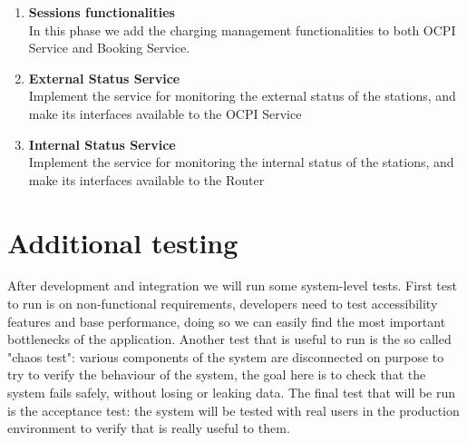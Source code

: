 \begin{enumerate}
	\item \textbf{Sessions functionalities}\\ In this phase we add the charging management functionalities to both OCPI Service and Booking Service.
	\item \textbf{External Status Service}\\ Implement the service for monitoring the external status of the stations, and make its interfaces available to the OCPI Service
	\item \textbf{Internal Status Service}\\ Implement the service for monitoring the internal status of the stations, and make its interfaces available to the Router
\end{enumerate}


\section{Additional testing}
After development and integration we will run some system-level tests.
First test to run is on non-functional requirements, developers need to test accessibility features and base performance, doing so we can easily find the most important bottlenecks of the application.
Another test that is useful to run is the so called "chaos test": various components of the system are disconnected on purpose to try to verify the behaviour of the system, the goal here is to check that the system fails safely, without losing or leaking data. 
The final test that will be run is the acceptance test: the system will be tested with real users in the production environment to verify that is really useful to them.






